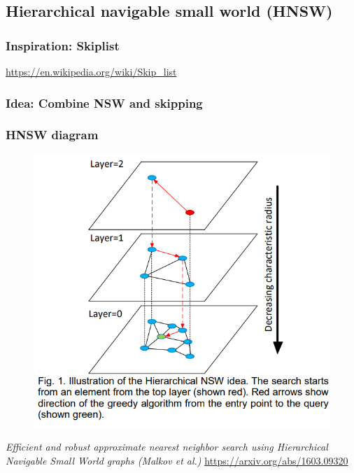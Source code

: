 \documentclass{beamer}
\begin{document}
\subsection{Hierarchical navigable small world (HNSW)}

\begin{frame}
\frametitle{Inspiration: Skiplist}
          \begin{figure}[skip_list]
  
  \end{figure}
  \vspace{-0.1cm}
  \small \centering \url{https://en.wikipedia.org/wiki/Skip_list}
\end{frame}

\begin{frame}
\frametitle{Idea: Combine NSW and skipping}
    \Large
   	\begin{itemize}
	\end{itemize} 
\end{frame}

  \begin{frame}
    \frametitle{HNSW diagram}  
  \begin{figure}[hnsw_paper_fig_1]
    \vspace*{-0.1cm}
  	\includegraphics[scale=0.3]{hnsw_paper_fig_1} 	
  \end{figure} 
  \vspace{-0.3cm}
  \scriptsize \centering \textit{Efficient and robust approximate nearest neighbor search using Hierarchical Navigable Small World graphs (Malkov et al.)} \url{https://arxiv.org/abs/1603.09320} 
  \end{frame}
\end{document}
